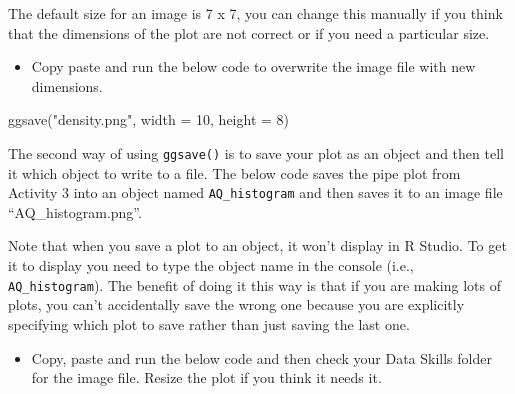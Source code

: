 \documentclass[
  oneside]{book}
\newenvironment{Shaded}{\begin{snugshade}}{\end{snugshade}}
\newcommand{\AttributeTok}[1]{\textcolor[rgb]{0.77,0.63,0.00}{#1}}
\newcommand{\DecValTok}[1]{\textcolor[rgb]{0.00,0.00,0.81}{#1}}
\newcommand{\FunctionTok}[1]{\textcolor[rgb]{0.00,0.00,0.00}{#1}}
\newcommand{\NormalTok}[1]{#1}
\newcommand{\StringTok}[1]{\textcolor[rgb]{0.31,0.60,0.02}{#1}}
\providecommand{\tightlist}{%
  \setlength{\itemsep}{0pt}\setlength{\parskip}{0pt}}
\begin{document}
The default size for an image is 7 x 7, you can change this manually if you think that the dimensions of the plot are not correct or if you need a particular size.

\begin{itemize}
\tightlist
\item
  Copy paste and run the below code to overwrite the image file with new dimensions.
\end{itemize}

\begin{Shaded}
\begin{Highlighting}[]
\FunctionTok{ggsave}\NormalTok{(}\StringTok{"density.png"}\NormalTok{, }\AttributeTok{width =} \DecValTok{10}\NormalTok{, }\AttributeTok{height =} \DecValTok{8}\NormalTok{)}
\end{Highlighting}
\end{Shaded}

The second way of using \texttt{ggsave()} is to save your plot as an object and then tell it which object to write to a file. The below code saves the pipe plot from Activity 3 into an object named \texttt{AQ\_histogram} and then saves it to an image file ``AQ\_histogram.png''.

Note that when you save a plot to an object, it won't display in R Studio. To get it to display you need to type the object name in the console (i.e., \texttt{AQ\_histogram}). The benefit of doing it this way is that if you are making lots of plots, you can't accidentally save the wrong one because you are explicitly specifying which plot to save rather than just saving the last one.

\begin{itemize}
\tightlist
\item
  Copy, paste and run the below code and then check your Data Skills folder for the image file. Resize the plot if you think it needs it.
\end{itemize}
\end{document}
